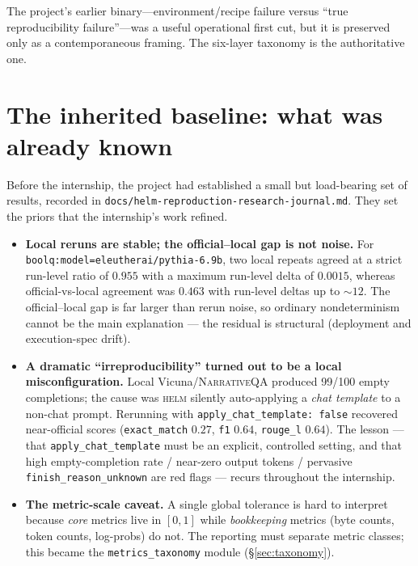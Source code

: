 \documentclass[11pt]{report}
\newcommand{\code}[1]{\texttt{#1}}
\newcommand{\file}[1]{\texttt{#1}}
\begin{document}
The project's earlier binary---environment/recipe failure versus ``true
reproducibility failure''---was a useful operational first cut, but it is preserved
only as a contemporaneous framing. The six-layer taxonomy is the authoritative one.

\section{The inherited baseline: what was already known}
\label{sec:inherited}

Before the internship, the project had established a small but load-bearing set of
results, recorded in \file{docs/helm-reproduction-research-journal.md}. They set
the priors that the internship's work refined.

\begin{itemize}
  \item \textbf{Local reruns are stable; the official--local gap is not noise.} For
        \code{boolq:model=eleutherai/pythia-6.9b}, two local repeats agreed at a
        strict run-level ratio of $0.955$ with a maximum run-level delta of
        $0.0015$, whereas official-vs-local agreement was $0.463$ with run-level
        deltas up to $\sim\!12$. The official--local gap is far larger than
        rerun noise, so ordinary nondeterminism cannot be the main explanation ---
        the residual is structural (deployment and execution-spec drift).
  \item \textbf{A dramatic ``irreproducibility'' turned out to be a local
        misconfiguration.} Local Vicuna/\textsc{NarrativeQA} produced 99/100 empty
        completions; the cause was \textsc{helm} silently auto-applying a
        \emph{chat template} to a non-chat prompt. Rerunning with
        \code{apply\_chat\_template: false} recovered near-official scores
        (\code{exact\_match} $0.27$, \code{f1} $0.64$, \code{rouge\_l} $0.64$).
        The lesson --- that \code{apply\_chat\_template} must be an explicit,
        controlled setting, and that high empty-completion rate / near-zero output
        tokens / pervasive \code{finish\_reason\_unknown} are red flags --- recurs
        throughout the internship.
  \item \textbf{The metric-scale caveat.} A single global tolerance is hard to
        interpret because \emph{core} metrics live in $[0,1]$ while
        \emph{bookkeeping} metrics (byte counts, token counts, log-probs) do not.
        The reporting must separate metric classes; this became the
        \code{metrics\_taxonomy} module (\S\ref{sec:taxonomy}).
\end{itemize}
\end{document}
